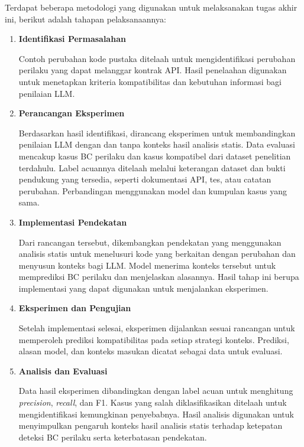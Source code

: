 Terdapat beberapa metodologi yang digunakan untuk melaksanakan tugas akhir ini, berikut adalah tahapan pelaksanaannya:

\begin{enumerate}
    \item \textbf{Identifikasi Permasalahan}

    \nopagebreak
    Contoh perubahan kode pustaka ditelaah untuk mengidentifikasi perubahan perilaku yang dapat melanggar kontrak API\@. Hasil penelaahan digunakan untuk menetapkan kriteria kompatibilitas dan kebutuhan informasi bagi penilaian LLM\@.

    \item \textbf{Perancangan Eksperimen}

    \nopagebreak
    Berdasarkan hasil identifikasi, dirancang eksperimen untuk membandingkan penilaian LLM dengan dan tanpa konteks hasil analisis statis. Data evaluasi mencakup kasus BC perilaku dan kasus kompatibel dari dataset penelitian terdahulu. Label acuannya ditelaah melalui keterangan dataset dan bukti pendukung yang tersedia, seperti dokumentasi API, tes, atau catatan perubahan. Perbandingan menggunakan model dan kumpulan kasus yang sama.

    \item \textbf{Implementasi Pendekatan}

    \nopagebreak
    Dari rancangan tersebut, dikembangkan pendekatan yang menggunakan analisis statis untuk menelusuri kode yang berkaitan dengan perubahan dan menyusun konteks bagi LLM\@. Model menerima konteks tersebut untuk memprediksi BC perilaku dan menjelaskan alasannya. Hasil tahap ini berupa implementasi yang dapat digunakan untuk menjalankan eksperimen.

    \item \textbf{Eksperimen dan Pengujian}

    \nopagebreak
    Setelah implementasi selesai, eksperimen dijalankan sesuai rancangan untuk memperoleh prediksi kompatibilitas pada setiap strategi konteks. Prediksi, alasan model, dan konteks masukan dicatat sebagai data untuk evaluasi.

    \item \textbf{Analisis dan Evaluasi}

    \nopagebreak
    Data hasil eksperimen dibandingkan dengan label acuan untuk menghitung \textit{precision}, \textit{recall}, dan F1. Kasus yang salah diklasifikasikan ditelaah untuk mengidentifikasi kemungkinan penyebabnya. Hasil analisis digunakan untuk menyimpulkan pengaruh konteks hasil analisis statis terhadap ketepatan deteksi BC perilaku serta keterbatasan pendekatan.
\end{enumerate}

\endgroup

